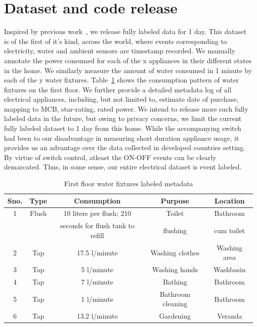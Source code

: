 \documentclass[10pt]{sensys-proc}
\newcommand{\tabref}[1]{Table~\ref{#1}}
\begin{document}
\section{Dataset and code release}
Inspired by previous work~\cite{blued_cmu}, we release fully labeled data for 1 day. This dataset is of the first of it's kind, across the world, where events corresponding to electricity, water and ambient sensors are timestamp recorded. We manually annotate the power consumed for each of the x appliances in their different states in the home. We similarly measure the amount of water consumed in 1 minute by each of the y water fixtures. \tabref{tab:water_consumption_labeled} shows the consumption pattern of water fixtures on the first floor. We further provide a detailed metadata log of all electrical appliances, including, but not limited to, estimate date of purchase, mapping to MCB, star-rating, rated power. We intend to release more such fully labeled data in the future, but owing to privacy concerns, we limit the current fully labeled dataset to 1 day from this home. While the accompanying switch had been to our disadvantage in measuring short duration appliance usage, it provides us an advantage over the data collected in developed countries setting. By virtue of switch control, atleast the ON-OFF events can be clearly demarcated. Thus, in some sense, our entire electrical dataset is event labeled. 

\begin{table}
\tabcolsep=0.015cm
\vspace{-4mm}
\caption{First floor water fixtures labeled metadata}
\vspace{-4mm}
\label{tab:water_consumption_labeled}
\footnotesize
\begin{tabular}{|c|c|c|c|c|}
\hline
\textbf{Sno.}&\textbf{Type}&\textbf{Consumption}&\textbf{Purpose}&\textbf{Location}\\
\hline
1&Flush&10 liters per flush; 210&Toilet&Bathroom\\
 &&seconds for flush tank to refill&flushing&cum toilet\\ \hline
2&Tap&17.5 l/minute&Washing clothes&Washing area\\ \hline
3&Tap&5 l/minute&Washing hands&Washbasin\\ \hline
4&Tap&7 l/minute&Bathing&Bathroom\\ \hline
5&Tap&1 l/minute&Bathroom cleaning&Bathroom\\ \hline
6&Tap&13.2 l/minute&Gardening&Veranda\\ \hline

\end{tabular}
\end{table}
\end{document}

